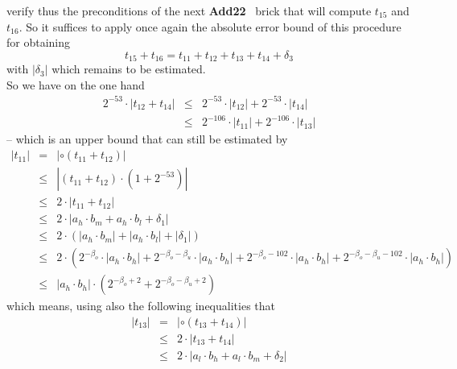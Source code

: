\documentclass[a4paper,10pt,twoside]{article}
\newenvironment{proof}[1][Proof]{\begin{trivlist}
\item[\hskip \labelsep {\bfseries #1}]}{\end{trivlist}}
\newcommand{\hi}{\ensuremath{\mathit{h}}}
\newcommand{\mi}{\ensuremath{\mathit{m}}}
\newcommand{\lo}{\ensuremath{\mathit{l}}}
\newcommand{\AddDD}{{\bf Add22}}
\begin{document}
\begin{proof}
verify thus the preconditions of the next \AddDD~ brick that will compute $t_{15}$ and $t_{16}$.
So it suffices to apply once again the absolute error bound of this procedure for obtaining
$$t_{15} + t_{16} = t_{11} + t_{12} + t_{13} + t_{14} + \delta_3$$ with $\left \vert \delta_3 \right \vert$ which remains to be 
estimated.\\
So we have on the one hand
\begin{eqnarray*}
2^{-53} \cdot \left \vert t_{12} + t_{14} \right \vert & \leq & 2^{-53} \cdot \left \vert t_{12} \right \vert + 2^{-53} \cdot
\left \vert t_{14} \right \vert \\
& \leq & 2^{-106} \cdot \left \vert t_{11} \right \vert + 2^{-106} \cdot \left \vert t_{13} \right \vert 
\end{eqnarray*}
-- which is an upper bound that can still be estimated by
\begin{eqnarray*}
\left \vert t_{11} \right \vert & = & \left \vert \circ \left( t_{11} + t_{12} \right) \right \vert \\
& \leq & \left \vert \left( t_{11} + t_{12} \right) \cdot \left( 1 + 2^{-53} \right) \right \vert \\
& \leq & 2 \cdot \left \vert t_{11} + t_{12} \right \vert \\
& \leq & 2 \cdot \left \vert a_\hi \cdot b_\mi + a_\hi \cdot b_\lo + \delta_1 \right \vert \\
& \leq & 2 \cdot \left( \left \vert a_\hi \cdot b_\mi \right \vert + \left \vert a_\hi \cdot b_\lo \right \vert + \left \vert \delta_1 \right \vert 
\right) \\
& \leq & 2 \cdot \left( 2^{-\beta_o} \cdot \left \vert a_\hi \cdot b_\hi \right \vert + 
2^{-\beta_o-\beta_u} \cdot \left \vert a_\hi \cdot b_\hi \right \vert +  
2^{-\beta_o-102} \cdot \left \vert a_\hi \cdot b_\hi \right \vert + 2^{-\beta_o-\beta_u-102} \cdot \left \vert a_\hi \cdot b_\hi \right \vert \right) \\
& \leq & \left \vert a_\hi \cdot b_\hi \right \vert \cdot \left( 2^{-\beta_o+2} + 2^{-\beta_o-\beta_u+2} \right)
\end{eqnarray*}
which means, using also the following inequalities that
\begin{eqnarray*}
\left \vert t_{13} \right \vert & = & \left \vert \circ \left( t_{13} + t_{14} \right) \right \vert \\
& \leq & 2 \cdot \left \vert t_{13} + t_{14} \right \vert \\
& \leq & 2 \cdot \left \vert a_\lo \cdot b_\hi + a_\lo \cdot b_\mi + \delta_2 \right \vert \\

\end{eqnarray*}
\end{proof}
\end{document}
